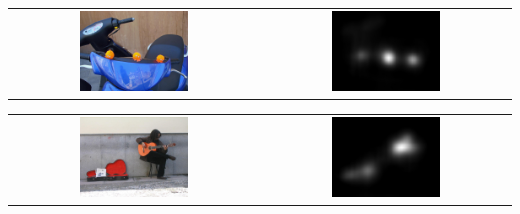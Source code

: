 \documentclass[10pt]{beamer}
\begin{document}
\begin{frame}{}
    \begin{center}
        \begin{tabular} {cc}
        \includegraphics[width=0.45\textwidth]{./img/orange_balls.jpg} &
        \includegraphics[width=0.45\textwidth]{./img/orange_balls_map.jpg}
        \end{tabular}
    \end{center}
\end{frame}

\begin{frame}{}
    \begin{center}
        \begin{tabular} {cc}
        \includegraphics[width=0.45\textwidth]{./img/guitarist.jpg} &
        \includegraphics[width=0.45\textwidth]{./img/guitarist_map.jpg}
        \end{tabular}
    \end{center}
\end{frame}
\end{document}
